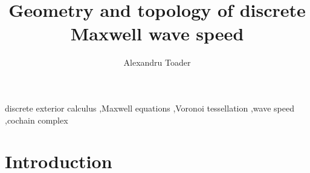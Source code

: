 \documentclass[preprint,12pt]{elsarticle}
\begin{document}
\begin{frontmatter}
\title{Geometry and topology of discrete Maxwell wave speed}
\author{Alexandru Toader}

\begin{abstract}
%
%
\end{abstract}

\begin{keyword}
discrete exterior calculus \sep Maxwell equations \sep Voronoi tessellation
\sep wave speed \sep cochain complex
\end{keyword}
\end{frontmatter}


\section{Introduction}
\label{sec:intro}

%
%
%
%
%
%
\end{document}

